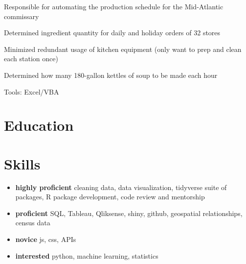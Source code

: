 \documentclass[11pt, a4paper]{awesome-cv}
\providecommand{\tightlist}{%
	\setlength{\itemsep}{0pt}\setlength{\parskip}{0pt}}
\begin{document}
\begin{cventries}
{\begin{cvitems}
\item Responsible for automating the production schedule for the Mid-Atlantic commissary
\item Determined ingredient quantity for daily and holiday orders of 32 stores
\item Minimized redundant usage of kitchen equipment (only want to prep and clean each station once)
\item Determined how many 180-gallon kettles of soup to be made each hour
\item Tools: Excel/VBA
\end{cvitems}}
\end{cventries}

\hypertarget{education}{%
\section{\texorpdfstring{
Education}{ Education}}\label{education}}

\begin{cventries}
    \vspace{-4.0mm}
\end{cventries}

\hypertarget{skills}{%
\section{\texorpdfstring{ Skills}{ Skills}}\label{skills}}

\begin{itemize}
\tightlist
\item
  \textbf{highly proficient} cleaning data, data visualization,
  tidyverse suite of packages, R package development, code review and
  mentorship
\item
  \textbf{proficient} SQL, Tableau, Qliksense, shiny, github, geospatial
  relationships, census data
\item
  \textbf{novice} js, css, APIs
\item
  \textbf{interested} python, machine learning, statistics
\end{itemize}
\end{document}
